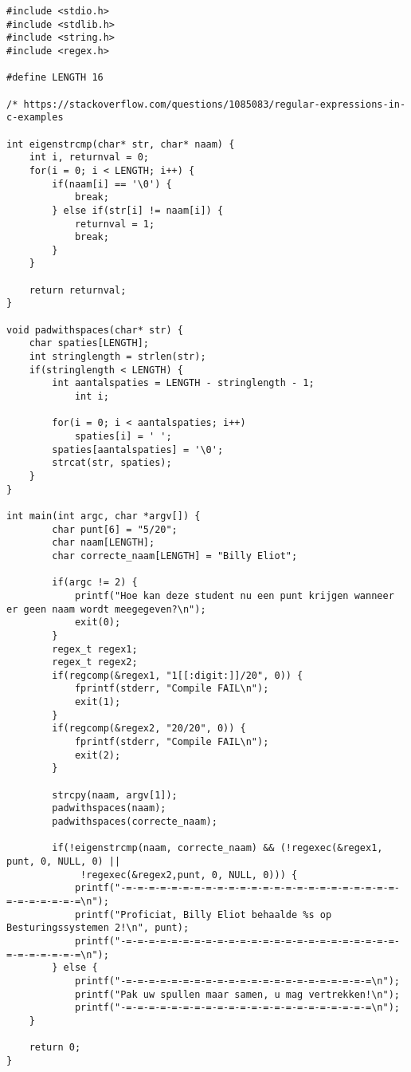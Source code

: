 \begin{lstlisting}
#include <stdio.h>
#include <stdlib.h>
#include <string.h>
#include <regex.h>

#define LENGTH 16

/* https://stackoverflow.com/questions/1085083/regular-expressions-in-c-examples 

int eigenstrcmp(char* str, char* naam) {
	int i, returnval = 0;
	for(i = 0; i < LENGTH; i++) {
		if(naam[i] == '\0') {
			break;
		} else if(str[i] != naam[i]) {
			returnval = 1;
			break;
		}
	}

	return returnval;
}

void padwithspaces(char* str) {
	char spaties[LENGTH];
	int stringlength = strlen(str);
	if(stringlength < LENGTH) {
		int aantalspaties = LENGTH - stringlength - 1;
			int i;

		for(i = 0; i < aantalspaties; i++)
			spaties[i] = ' ';
		spaties[aantalspaties] = '\0';
		strcat(str, spaties);
	}
}

int main(int argc, char *argv[]) {
		char punt[6] = "5/20";
		char naam[LENGTH];
		char correcte_naam[LENGTH] = "Billy Eliot";

		if(argc != 2) {
			printf("Hoe kan deze student nu een punt krijgen wanneer er geen naam wordt meegegeven?\n");
			exit(0);
		}
		regex_t regex1;
		regex_t regex2;
		if(regcomp(&regex1, "1[[:digit:]]/20", 0)) {
			fprintf(stderr, "Compile FAIL\n");
			exit(1);
		}
		if(regcomp(&regex2, "20/20", 0)) {
			fprintf(stderr, "Compile FAIL\n");
			exit(2);
		}

		strcpy(naam, argv[1]);
		padwithspaces(naam);
		padwithspaces(correcte_naam);

		if(!eigenstrcmp(naam, correcte_naam) && (!regexec(&regex1, punt, 0, NULL, 0) ||
			 !regexec(&regex2,punt, 0, NULL, 0))) {
			printf("-=-=-=-=-=-=-=-=-=-=-=-=-=-=-=-=-=-=-=-=-=-=-=-=-=-=-=-=-=-=-=\n");
			printf("Proficiat, Billy Eliot behaalde %s op Besturingssystemen 2!\n", punt);
			printf("-=-=-=-=-=-=-=-=-=-=-=-=-=-=-=-=-=-=-=-=-=-=-=-=-=-=-=-=-=-=-=\n");
		} else {
			printf("-=-=-=-=-=-=-=-=-=-=-=-=-=-=-=-=-=-=-=-=-=-=\n");
			printf("Pak uw spullen maar samen, u mag vertrekken!\n");
			printf("-=-=-=-=-=-=-=-=-=-=-=-=-=-=-=-=-=-=-=-=-=-=\n");
	}

	return 0;
}
\end{lstlisting}